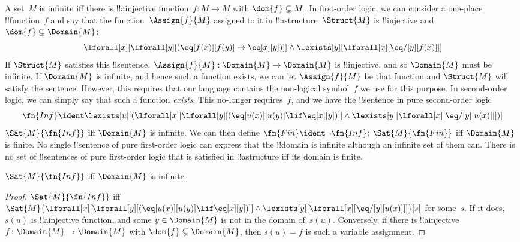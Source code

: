 \documentclass[../../../include/open-logic-section]{subfiles}
\begin{document}


A set~$M$ is infinite iff there is !!a{injective} function~$f\colon M
\to M$ with $\dom{f} \subsetneq M$. In first-order logic, we can
consider a one-place !!{function}~$f$ and say that the
function~$\Assign{f}{M}$ assigned to it in !!a{structure}~$\Struct{M}$
is !!{injective} and $\dom{f} \subsetneq \Domain{M}$:
\[
\lforall[x][\lforall[y][(\eq[f(x)][f(y)] \to \eq[x][y])]] \land
\lexists[y][\lforall[x][\eq/[y][f(x)]]]
\]
If $\Struct{M}$ satisfies this !!{sentence}, $\Assign{f}{M}:
\Domain{M} \to \Domain{M}$ is !!{injective}, and so $\Domain{M}$ must
be infinite. If $\Domain{M}$ is infinite, and hence such a function
exists, we can let $\Assign{f}{M}$ be that function and $\Struct{M}$
will satisfy the sentence.  However, this requires that our language
contains the non-logical symbol~$f$ we use for this purpose. In
second-order logic, we can simply say that such a function
\emph{exists}. This no-longer requires~$f$, and we have the
!!{sentence} in pure second-order logic
\[
\fn{Inf} \ident \lexists[u][(\lforall[x][\lforall[y][(\eq[u(x)][u(y)]
      \lif \eq[x][y])]] \land \lexists[y][\lforall[x][\eq/[y][u(x)]]])]
\]
$\Sat{M}{\fn{Inf}}$ iff $\Domain{M}$ is infinite.  We can then define
$\fn{Fin} \ident \lnot \fn{Inf}$; $\Sat{M}{\fn{Fin}}$ iff $\Domain{M}$
is finite. No single !!{sentence} of pure first-order logic can
express that the !!{domain} is infinite although an infinite set of
them can. There is no set of !!{sentence}s of pure first-order logic
that is satisfied in !!a{structure} iff its domain is finite.

\begin{prop}
$\Sat{M}{\fn{Inf}}$ iff $\Domain{M}$ is infinite.
\end{prop}

\begin{proof}
$\Sat{M}{\fn{Inf}}$ iff
  $\Sat{M}{\lforall[x][\lforall[y][(\eq[u(x)][u(y)] \lif \eq[x][y])]]
    \land \lexists[y][\lforall[x][\eq/[y][u(x)]]]}[s]$ for
  some~$s$. If it does, $s(u)$ is !!a{injective} function, and some $y
  \in \Domain{M}$ is not in the domain of~$s(u)$. Conversely, if there
  is !!a{injective} $f\colon \Domain{M} \to \Domain{M}$ with $\dom{f}
  \subsetneq \Domain{M}$, then $s(u) = f$ is such a variable
  assignment.
\end{proof}
\end{document}
